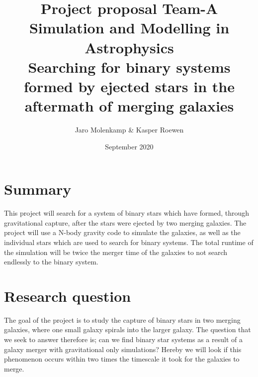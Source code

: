 \documentclass{article}
\title{Project proposal Team-A\\ Simulation and Modelling in Astrophysics\\ Searching for binary systems formed by ejected stars in the aftermath of merging galaxies}
\author{Jaro Molenkamp \& Kasper Roewen }
\date{September 2020}
\begin{document}
\maketitle

\section{Summary}%
This project will search for a system of binary stars which have formed, through gravitational capture, after the stars were ejected by two merging galaxies. The project will use a N-body gravity code to simulate the galaxies, as well as the individual stars which are used to search for binary systems. The total runtime of the simulation will be twice the merger time of the galaxies to not search endlessly to the binary system.

\section{Research question}%
The goal of the project is to study the capture of binary stars in two merging galaxies, where one small galaxy spirals into the larger galaxy. The question that we seek to answer therefore is; can we find binary star systems as a result of a galaxy merger with gravitational only simulations? Hereby we will look if this phenomenon occurs within two times the timescale it took for the galaxies to merge.
\end{document}
